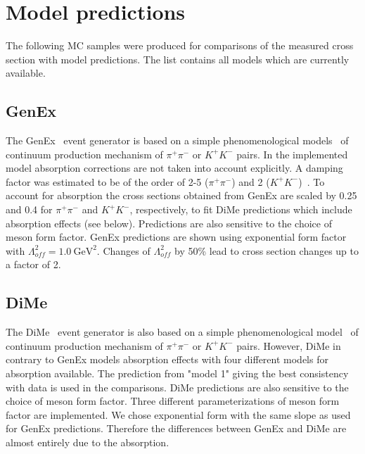 \section{Model predictions}\label{sec:mcModelPred}

The following MC samples were produced for comparisons of the measured cross section with model predictions. The list contains all models which are currently available.

\subsection{GenEx}
The GenEx~\cite{GenEx} event generator is based on a simple phenomenological models~\cite{LSmodel, LSModelKK} of continuum production mechanism of $\pi^+\pi^-$ or $K^+K^-$ pairs. In the implemented model absorption corrections are not taken into account explicitly. A damping factor was estimated to be of the order of 2-5 ($\pi^+\pi^-$) and 2 ($K^+K^-$)~\cite{LSAbsorption}. To account for absorption the cross sections obtained from GenEx are scaled by 0.25 and 0.4 for $\pi^+\pi^-$ and $K^+K^-$, respectively, to fit DiMe predictions which include absorption effects (see below). Predictions are also sensitive to the choice of meson form factor. GenEx predictions are shown using exponential form factor with $\Lambda_{of\!f}^{2}=1.0~\textrm{GeV}^{2}$. Changes of $\Lambda_{of\!f}^{2}$ by 50\% lead to cross section changes up to a factor of 2.

\subsection{DiMe}
The DiMe~\cite{DurhamModel} event generator is also based on a simple phenomenological model~\cite{harland_lang_1} of continuum production mechanism of $\pi^+\pi^-$ or $K^+K^-$ pairs. However, DiMe in contrary to GenEx models absorption effects with four different models for absorption available. The prediction from "model 1" giving the best consistency with data is used in the comparisons. DiMe predictions are also sensitive to the choice of meson form factor. Three different parameterizations of meson form factor are implemented. We chose exponential form with the same slope as used for GenEx predictions. Therefore the differences between GenEx and DiMe are almost entirely due to the absorption.

